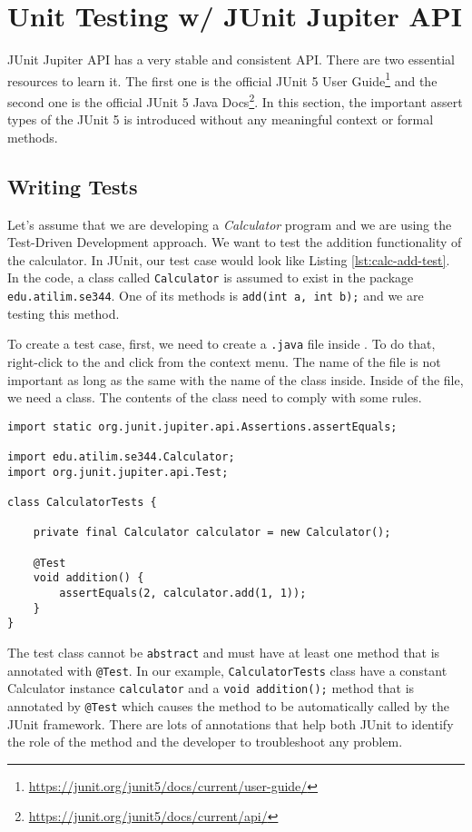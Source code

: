 \chapter{Unit Testing w/ JUnit Jupiter API}
JUnit Jupiter API has a very stable and consistent API. There are two essential resources to learn it. The first one is the official JUnit 5 User Guide\footnote{\url{https://junit.org/junit5/docs/current/user-guide/}} and the second one is the official JUnit 5 Java Docs\footnote{\url{https://junit.org/junit5/docs/current/api/}}. In this section, the important assert types of the JUnit 5 is introduced without any meaningful context or formal methods.

\section{Writing Tests}
Let's assume that we are developing a \emph{Calculator} program and we are using the Test-Driven Development approach. We want to test the addition functionality of the calculator. In JUnit, our test case would look like Listing \ref{lst:calc-add-test}. In the code, a class called \verb|Calculator| is assumed to exist in the package \lstinline|edu.atilim.se344|. One of its methods is \lstinline!add(int a, int b);! and we are testing this method.

To create a test case, first, we need to create a \lstinline[language={}]|.java| file inside . To do that, right-click to the  and click  from the context menu. The name of the file is not important as long as the same with the name of the class inside. Inside of the file, we need a class. The contents of the class need to comply with some rules.

\begin{lstlisting}[caption={A test case for testing the addition functionality of the Calculator class.},label=lst:calc-add-test]
import static org.junit.jupiter.api.Assertions.assertEquals;

import edu.atilim.se344.Calculator;
import org.junit.jupiter.api.Test;

class CalculatorTests {

    private final Calculator calculator = new Calculator();

    @Test
    void addition() {
        assertEquals(2, calculator.add(1, 1));
    }
}
\end{lstlisting}

The test class cannot be \lstinline{abstract} and must have at least one method that is annotated with \lstinline!@Test!. In our example, \lstinline|CalculatorTests| class have a constant Calculator instance \lstinline|calculator| and a \lstinline!void addition();! method that is annotated by \lstinline!@Test! which causes the method to be automatically called by the JUnit framework. There are lots of annotations that help both JUnit to identify the role of the method and the developer to troubleshoot any problem.

